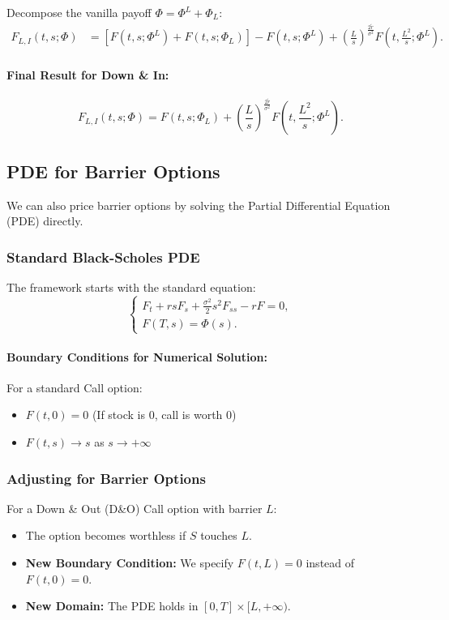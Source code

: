 \documentclass[12pt,a4paper]{article}
\theoremstyle{definition}
\begin{document}
Decompose the vanilla payoff $\Phi = \Phi^L + \Phi_L$:
\[
\begin{aligned}
F_{L,I}(t, s; \Phi) &= \left[F(t, s; \Phi^L) + F(t, s; \Phi_L)\right] - F(t, s; \Phi^L) + \left(\frac{L}{s}\right)^{\frac{2\widetilde{r}}{\sigma^2}} F\!\left(t, \frac{L^2}{s}; \Phi^L\right).
\end{aligned}
\]

\paragraph{Final Result for Down \& In:}
\[
F_{L,I}(t, s; \Phi) = F(t, s; \Phi_L) + \left(\frac{L}{s}\right)^{\frac{2\widetilde{r}}{\sigma^2}} F\!\left(t, \frac{L^2}{s}; \Phi^L\right).
\]

\subsection{PDE for Barrier Options}

We can also price barrier options by solving the Partial Differential Equation (PDE) directly.

\subsubsection{Standard Black-Scholes PDE}

The framework starts with the standard equation:
\[
\begin{cases}
F_t + rs F_s + \frac{\sigma^2}{2} s^2 F_{ss} - rF = 0, \\
F(T, s) = \Phi(s).
\end{cases}
\]

\paragraph{Boundary Conditions for Numerical Solution:}

For a standard Call option:
\begin{itemize}
\item $F(t, 0) = 0$ (If stock is 0, call is worth 0)
\item $F(t, s) \to s$ as $s \to +\infty$
\end{itemize}

\subsubsection{Adjusting for Barrier Options}

For a Down \& Out (D\&O) Call option with barrier $L$:
\begin{itemize}
\item The option becomes worthless if $S$ touches $L$.
\item \textbf{New Boundary Condition:} We specify $F(t, L) = 0$ instead of $F(t, 0) = 0$.
\item \textbf{New Domain:} The PDE holds in $[0, T] \times [L, +\infty)$.
\end{itemize}
\end{document}
